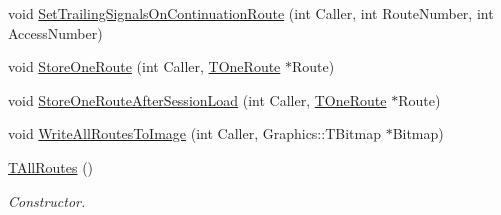 \begin{DoxyCompactItemize}
\item 
void \mbox{\hyperlink{class_t_all_routes_a18177a40331bb96bbec791245b541f47}{Set\+Trailing\+Signals\+On\+Continuation\+Route}} (int Caller, int Route\+Number, int Access\+Number)
\item 
void \mbox{\hyperlink{class_t_all_routes_af70c07d73f0b62ed85bbebc5451d009c}{Store\+One\+Route}} (int Caller, \mbox{\hyperlink{class_t_one_route}{T\+One\+Route}} $\ast$Route)
\item 
void \mbox{\hyperlink{class_t_all_routes_a7bf52152ec8f71a9aa78ad4dc4f80c65}{Store\+One\+Route\+After\+Session\+Load}} (int Caller, \mbox{\hyperlink{class_t_one_route}{T\+One\+Route}} $\ast$Route)
\item 
void \mbox{\hyperlink{class_t_all_routes_a7c9ca14ec6116983b505f0a451dd078f}{Write\+All\+Routes\+To\+Image}} (int Caller, Graphics\+::\+T\+Bitmap $\ast$Bitmap)
\item 
\mbox{\label{class_t_all_routes_ad562b9a2301042e109db1a895235e36f}} 
\mbox{\hyperlink{class_t_all_routes_ad562b9a2301042e109db1a895235e36f}{T\+All\+Routes}} ()
\begin{DoxyCompactList}\small\item\em Constructor. \end{DoxyCompactList}\end{DoxyCompactItemize}
